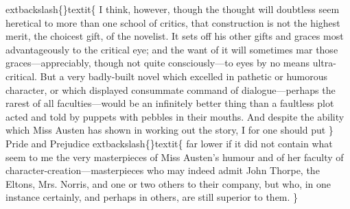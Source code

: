 \documentclass[10pt]{book}
\begin{document}
	extbackslash\{\}textit\{
    I think, however, though the thought will doubtless seem heretical to
more than one school of critics, that construction is not the highest
merit, the choicest gift, of the novelist. It sets off his other gifts
and graces most advantageously to the critical eye; and the want of it
will sometimes mar those graces—appreciably, though not quite
consciously—to eyes by no means ultra-critical. But a very badly-built
novel which excelled in pathetic or humorous character, or which
displayed consummate command of dialogue—perhaps the rarest of all
faculties—would be an infinitely better thing than a faultless plot
acted and told by puppets with pebbles in their mouths. And despite the
ability which Miss Austen has shown in working out the story, I for one
should put
   \}
   Pride and Prejudice
   	extbackslash\{\}textit\{
    far lower if it did not contain what
seem to me the very masterpieces of Miss Austen’s humour and of her
faculty of character-creation—masterpieces who may indeed admit John
Thorpe, the Eltons, Mrs. Norris, and one or two others to their company,
but who, in one instance certainly, and perhaps in others, are still
superior to them.
   \}
\end{document}
